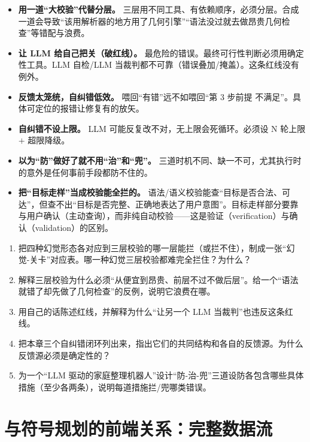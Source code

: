 \begin{pitfall}[本节常见陷阱]
\begin{itemize}
  \item \textbf{用一道“大校验”代替分层。} 三层用不同工具、有依赖顺序，必须分层。合成一道会导致“该用解析器的地方用了几何引擎”“语法没过就去做昂贵几何检查”等错配与浪费。
  \item \textbf{让 LLM 给自己把关（破红线）。} 最危险的错误。最终可行性判断必须用确定性工具。LLM 自检/LLM 当裁判都不可靠（错误叠加/掩盖）。这条红线没有例外。
  \item \textbf{反馈太笼统，自纠错低效。} 喂回“有错”远不如喂回“第 3 步前提 \verb@handempty@ 不满足”。具体可定位的报错让修复有的放矢。
  \item \textbf{自纠错不设上限。} LLM 可能反复改不对，无上限会死循环。必须设 N 轮上限 $+$ 超限降级。
  \item \textbf{以为“防”做好了就不用“治”和“兜”。} 三道时机不同、缺一不可，尤其执行时的意外是任何事前手段都防不住的。
  \item \textbf{把“目标走样”当成校验能全拦的。} 语法/语义校验能查“目标是否合法、可达”，但查不出“目标是否完整、正确地表达了用户意图”。目标走样部分要靠与用户确认（主动查询），而非纯自动校验——这是验证（verification）与确认（validation）的区别。
\end{itemize}
\end{pitfall}

\begin{exercise}
\begin{enumerate}
  \item 把四种幻觉形态各对应到三层校验的哪一层能拦（或拦不住），制成一张“幻觉-关卡”对应表。哪一种幻觉三层校验都难完全拦住？为什么？
  \item 解释三层校验为什么必须“从便宜到昂贵、前层不过不做后层”。给一个“语法就错了却先做了几何检查”的反例，说明它浪费在哪。
  \item 用自己的话陈述红线，并解释为什么“让另一个 LLM 当裁判”也违反这条红线。
  \item 把本章三个自纠错闭环列出来，指出它们的共同结构和各自的反馈源。为什么反馈源必须是确定性的？
  \item 为一个“LLM 驱动的家庭整理机器人”设计“防-治-兜”三道设防各包含哪些具体措施（至少各两条），说明每道措施拦/兜哪类错误。
\end{enumerate}
\end{exercise}

\section{与符号规划的前端关系：完整数据流}
\label{sec:llm-dataflow}

